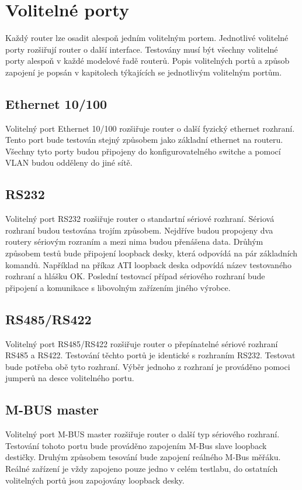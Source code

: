 \section{Volitelné porty}
Každý router lze osadit alespoň jedním volitelným portem. Jednotlivé volitelné porty rozšiřují router o další interface. Testovány musí být všechny volitelné porty alespoň v každé modelové řadě routerů. Popis volitelných portů a způsob zapojení je popsán v kapitolech týkajících se jednotlivým volitelným portům.

\subsection{Ethernet 10/100}
Volitelný port Ethernet 10/100 rozšiřuje router o další fyzický ethernet rozhraní. Tento port bude testován stejný způsobem jako základní ethernet na routeru. Všechny tyto porty budou připojeny do konfigurovatelného switche a pomocí VLAN budou odděleny do jiné sítě.

\subsection{RS232}
Volitelný port RS232 rozšiřuje router o standartní sériové rozhraní. Sériová rozhraní budou testována trojím způsobem. Nejdříve budou propojeny dva routery sériovým rozraním a mezi nima budou přenášena data. Drůhým způsobem testů bude připojení loopback desky, která odpovídá na pár základních komandů. Například na příkaz ATI loopback deska odpovídá název testovaného rozhraní a hlášku OK. Poslední testovací případ sériového rozhraní bude připojení a komunikace s libovolným zařízením jiného výrobce.

\subsection{RS485/RS422}
Volitelný port RS485/RS422 rozšiřuje router o přepínatelné sériové rozhraní RS485 a RS422. Testování těchto portů je identické s rozhraním RS232. Testovat bude potřeba obě tyto rozhraní. Výběr jednoho z rozhraní je prováděno pomoci jumperů na desce volitelného portu.

\subsection{M-BUS master}
Volitelný port M-BUS master rozšiřuje router o další typ sériového rozhraní. Testování tohoto portu bude prováděno zapojením M-Bus slave loopback destičky. Druhým způsobem tesování bude zapojení reálného M-Bus měřáku. Reálné zařízení je vždy zapojeno pouze jedno v celém testlabu, do ostatních volitelných portů jsou zapojovány loopback desky.

